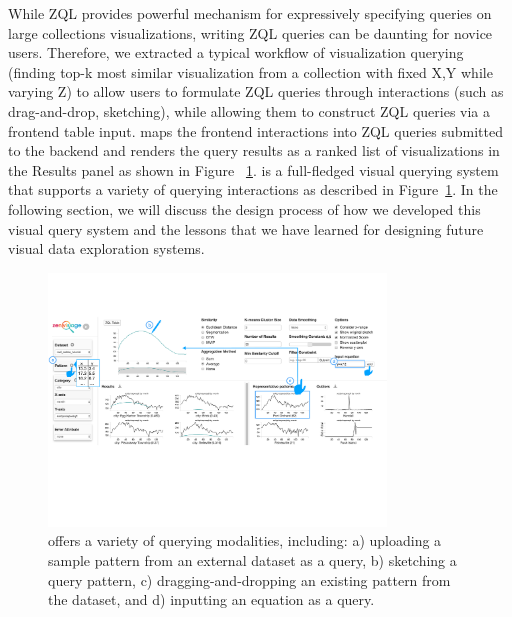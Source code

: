 \par While ZQL provides powerful mechanism for expressively specifying queries on large collections visualizations, writing ZQL queries can be daunting for novice users. Therefore, we extracted a typical workflow of visualization querying (finding top-k most similar visualization from a collection with fixed X,Y while varying Z) to allow users to formulate ZQL queries through interactions (such as drag-and-drop, sketching), while allowing them to construct ZQL queries via a frontend table input. \zv maps the frontend interactions into ZQL queries submitted to the backend and renders the query results as a ranked list of visualizations in the Results panel as shown in Figure ~\ref{fig:modalities}. \zv is a full-fledged visual querying system that supports a variety of querying interactions as described in Figure~\ref{fig:modalities}. In the following section, we will discuss the design process of how we developed this visual query system and the lessons that we have learned for designing future visual data exploration systems.

\begin{figure}[h!]
\label{fig:modalities}
\centering
\includegraphics[width=0.8\textwidth]{figures/modalities.pdf}
\caption{\zv offers a variety of querying modalities, including: a) uploading a sample pattern from an external dataset as a query, b) sketching a query pattern, c) dragging-and-dropping an existing pattern from the dataset, and d) inputting an equation as a query.}
\end{figure}
